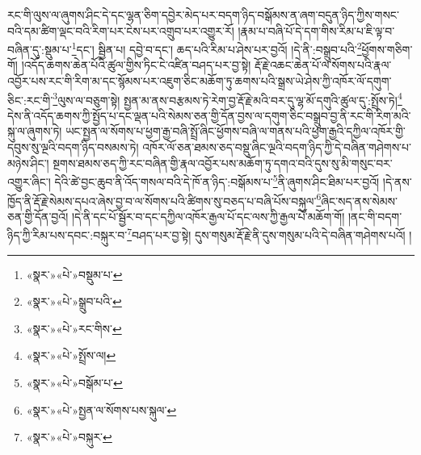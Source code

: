 རང་གི་ལུས་ལ་ཞུགས་ཤིང་དེ་དང་ལྷན་ཅིག་དབྱེར་མེད་པར་བདག་ཉིད་བསྒོམས་ན་ཞག་བདུན་ཉིད་ཀྱིས་གསང་བའི་དམ་ཚིག་ལྡང་བའི་རིག་པར་ངེས་པར་འགྲུབ་པར་འགྱུར་རོ། །རྣམ་པ་བཞི་པོ་དེ་དག་གིས་རིམ་པ་ཇི་ལྟ་བ་བཞིན་དུ་:སྡུམ་པ་\footnote{«སྣར་»«པེ་»བསྡུམ་པ་}དང་། སྦྱིན་པ། དབྱེ་བ་དང་། ཆད་པའི་རིམ་པ་ཤེས་པར་བྱའོ། །དེ་ནི་:བསྒྲུབ་པའི་\footnote{«སྣར་»«པེ་»སྒྲུབ་པའི་}ཕྱོགས་གཅིག་གོ། །འདོད་ཆགས་ཆེན་པོའི་ཚུལ་གྱིས་ཏིང་ངེ་འཛིན་བཤད་པར་བྱ་སྟེ། རྡོ་རྗེ་འཆང་ཆེན་པོ་ལ་སོགས་པའི་རྣལ་འབྱོར་པས་རང་གི་རིག་མ་དང་སྙོམས་པར་འཇུག་ཅིང་མཆོག་ཏུ་ཆགས་པའི་སྒྲས་ཡེ་ཤེས་ཀྱི་འཁོར་ལོ་དགུག་ཅིང་:རང་གི་\footnote{«སྣར་»«པེ་»རང་གིས་}ལུས་ལ་བཅུག་སྟེ། སྤྱན་མ་ནས་བརྩམས་ཏེ་རེག་བྱ་རྡོ་རྗེ་མའི་བར་དུ་ལྷ་མོ་དགུའི་ཚུལ་དུ་:སྤྲོས་ཏེ།\footnote{«སྣར་»«པེ་»སྤྲོས་ལ།} དེས་ནི་འདོད་ཆགས་ཀྱི་སྤྱོད་པ་དང་ལྡན་པའི་སེམས་ཅན་གྱི་དོན་བྱས་ལ་དགུག་ཅིང་བསྒྲུབ་བྱ་ནི་རང་གི་རིག་མའི་སྐུ་ལ་ཞུགས་ཏེ། ཡང་སྤྱན་ལ་སོགས་པ་ཕྱག་རྒྱ་བཞི་སྤྲོ་ཞིང་ཕྱོགས་བཞི་ལ་གནས་པའི་ཕྱག་རྒྱའི་དཀྱིལ་འཁོར་གྱི་དབུས་སུ་ལྔའི་བདག་ཉིད་བསམས་ཏེ། འཁོར་ལོ་ཅན་ཐམས་ཅད་བསྡུ་ཞིང་ལྔའི་བདག་ཉིད་ཀྱི་དེ་བཞིན་གཤེགས་པ་མཉེས་ཤིང་། སྔགས་ཐམས་ཅད་ཀྱི་རང་བཞིན་གྱི་རྣལ་འབྱོར་པས་མཆོག་ཏུ་དགའ་བའི་དུས་སུ་མི་གསུང་བར་འགྱུར་ཞིང་། དེའི་ཚེ་བྱང་ཆུབ་ནི་འོད་གསལ་བའི་དེ་ཁོ་ན་ཉིད་:བསྒོམས་པ་\footnote{«སྣར་»«པེ་»བསྒོམ་པ་}ནི་ཞུགས་ཤིང་ཐིམ་པར་བྱའོ། །དེ་ནས་ཁྱོད་ནི་རྡོ་རྗེ་སེམས་དཔའ་ཞེས་བྱ་བ་ལ་སོགས་པའི་ཚིགས་སུ་བཅད་པ་བཞི་པོས་བསྐུལ་\footnote{«སྣར་»«པེ་»སྤྱན་ལ་སོགས་པས་སྐུལ་}ཞིང་སད་ནས་སེམས་ཅན་གྱི་དོན་བྱའོ། །དེ་ནི་དང་པོ་སྦྱོར་བ་དང་དཀྱིལ་འཁོར་རྒྱལ་པོ་དང་ལས་ཀྱི་རྒྱལ་པོ་མཆོག་གོ། །ནང་གི་བདག་ཉིད་ཀྱི་རིམ་པས་དབང་:བསྐུར་བ་\footnote{«སྣར་»«པེ་»བསྐུར་}བཤད་པར་བྱ་སྟེ། དུས་གསུམ་རྡོ་རྗེ་ནི་དུས་གསུམ་པའི་དེ་བཞིན་གཤེགས་པའོ། །
